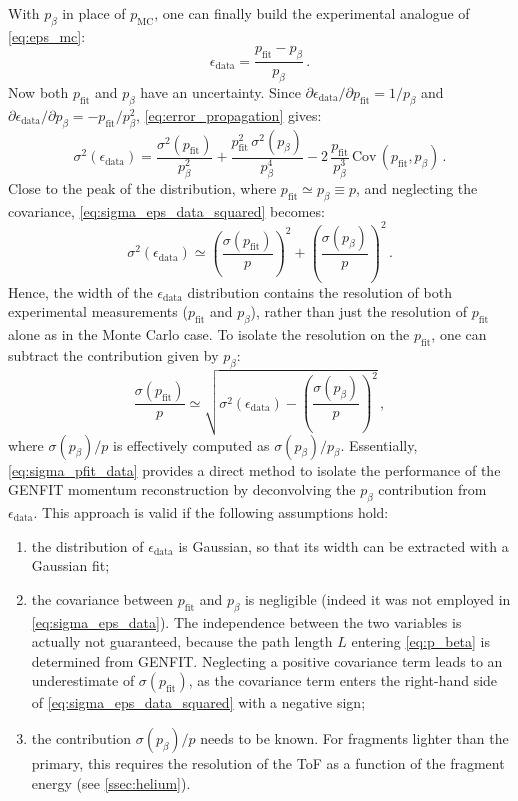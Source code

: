 With $p_\beta$ in place of $p_\text{MC}$, one can finally build the experimental analogue of \autoref{eq:eps_mc}:
\begin{equation}
	\epsilon_\text{data}=\frac{p_\text{fit}-p_\beta}{p_\beta}\,.
	\label{eq:eps_data}
\end{equation}
Now both $p_\text{fit}$ and $p_\beta$ have an uncertainty. Since $\partial\epsilon_\text{data}/\partial p_\text{fit}=1/p_\beta$ and $\partial\epsilon_\text{data}/\partial p_\beta=-p_\text{fit}/p_\beta^2$, \autoref{eq:error_propagation} gives:
\begin{equation}
	\sigma^2(\epsilon_\text{data})=\frac{\sigma^2(p_\text{fit})}{p_\beta^2}+\frac{p_\text{fit}^2\,\sigma^2(p_\beta)}{p_\beta^4}-2\,\frac{p_\text{fit}}{p_\beta^3}\,\text{Cov}\,(p_\text{fit},p_\beta)\,.
	\label{eq:sigma_eps_data_squared}
\end{equation}
Close to the peak of the distribution, where $p_\text{fit}\simeq p_\beta\equiv p$, and neglecting the covariance, \autoref{eq:sigma_eps_data_squared} becomes:
\begin{equation}
	\sigma^2(\epsilon_\text{data})\simeq\left(\frac{\sigma(p_\text{fit})}{p}\right)^2+\left(\frac{\sigma(p_\beta)}{p}\right)^2\,.
	\label{eq:sigma_eps_data}
\end{equation}
Hence, the width of the $\epsilon_\text{data}$ distribution contains the resolution of both experimental measurements ($p_\text{fit}$ and $p_\beta$), rather than just the resolution of $p_\text{fit}$ alone as in the Monte Carlo case. To isolate the resolution on the $p_\text{fit}$, one can subtract the contribution given by $p_\beta$:
\begin{equation}
	\frac{\sigma(p_\text{fit})}{p}\simeq\sqrt{\sigma^2(\epsilon_\text{data})-\left(\frac{\sigma(p_\beta)}{p}\right)^2}\,,
	\label{eq:sigma_pfit_data}
\end{equation}
where $\sigma(p_\beta)/p$ is effectively computed as $\sigma(p_\beta)/p_\beta$. Essentially, \autoref{eq:sigma_pfit_data} provides a direct method to isolate the performance of the GENFIT momentum reconstruction by deconvolving the $p_\beta$ contribution from $\epsilon_\text{data}$. This approach is valid if the following assumptions hold:
\begin{enumerate}
	\item the distribution of $\epsilon_\text{data}$ is Gaussian, so that its width can be extracted with a Gaussian fit;
	\item the covariance between $p_\text{fit}$ and $p_\beta$ is negligible (indeed it was not employed in \autoref{eq:sigma_eps_data}). The independence between the two variables is actually not guaranteed, because the path length $L$ entering \autoref{eq:p_beta} is determined from GENFIT. Neglecting a positive covariance term leads to an underestimate of $\sigma(p_\text{fit})$, as the covariance term enters the right-hand side of \autoref{eq:sigma_eps_data_squared} with a negative sign;
	\item the contribution $\sigma(p_\beta)/p$ needs to be known. For fragments lighter than the primary, this requires the resolution of the ToF as a function of the fragment energy (see \autoref{ssec:helium}).
\end{enumerate}
